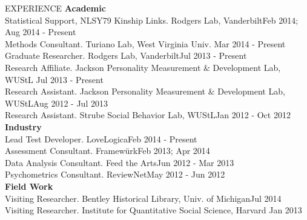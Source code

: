 \documentclass {resume}
\begin{document}
\begin{rSection}{\textrm{EXPERIENCE}}
{\large \textbf{Academic}}\\
Statistical Support, NLSY79 Kinship Links. Rodgers Lab, Vanderbilt\hfill Feb 2014; Aug 2014 - Present\smallskip\\
Methods Consultant. Turiano Lab, West Virginia Univ. \hfill Mar 2014 - Present\smallskip\\%
Graduate Researcher. Rodgers Lab, Vanderbilt\hfill Jul 2013 - Present\smallskip\\
Research Affiliate. Jackson Personality Measurement $\&$ Development Lab, WUStL \hfill Jul 2013 - Present\smallskip\\
Research Assistant. Jackson Personality Measurement $\&$ Development Lab, WUStL\hfill Aug 2012 - Jul 2013\smallskip\\
Research Assistant. Strube Social Behavior Lab, WUStL\hfill Jan 2012 - Oct 2012
\medskip\\
{\large \textbf{Industry}}\\
Lead Test Developer. LoveLogica\hfill Feb 2014 - Present\smallskip\\
Assessment Consultant. Framew\"{u}rk\hfill Feb 2013; Apr 2014\smallskip\\
Data Analysis Consultant. Feed the Arts\hfill Jun 2012 - Mar 2013\smallskip\\
Psychometrics Consultant. ReviewNet\hfill May 2012 - Jun 2012\medskip\\
{\large \textbf{Field Work}}\\
Visiting Researcher. Bentley Historical Library, Univ. of Michigan\hfill Jul 2014\smallskip\\
Visiting Researcher. Institute for Quantitative Social Science, Harvard \hfill Jan 2013%
\end{rSection}
\end{document}
